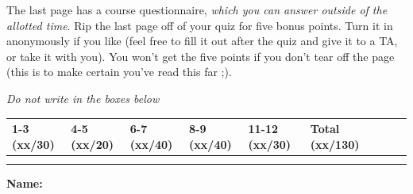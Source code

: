 \documentclass[11pt]{article}
\newcounter{answer}
\begin{document}
\begin{center}
\begin{boxedminipage}[h]{6in}
\vspace{.05in} 
The last page has a course questionnaire, {\em which you can
answer outside of the allotted time}.  Rip the last page off of your
quiz for five bonus points.  Turn it in anonymously if you like (feel
free to fill it out after the quiz and give it to a TA, or take it with
you).  
You
won't get the five points if you don't tear off the page (this is to
make certain you've read this far ;).
\fi 

\end{boxedminipage}
\end{center}
\vspace*{0.05in}
\begin{center}
{\it Do not write in the boxes below}
\end{center}

\begin{center}
\begin{tabular}{|l|l|l|l|l|l|l|l|l|} \hline \hline
{\bf 1-3 (xx/30)} & {\bf 4-5 (xx/20)} & {\bf 6-7 (xx/40)} & {\bf 8-9
  (xx/40)} & {\bf 11-12 (xx/30)} & {\bf Total
  (xx/130)}  \\ \hline 
& & & & & \\ 
& & & & & \\ \hline \hline
\end{tabular}
\end{center}

\vspace{.1in}
{\bf\Large{Name:}}

\newpage
\pagestyle{fancy}







\label{lastpage}
\end{document}
